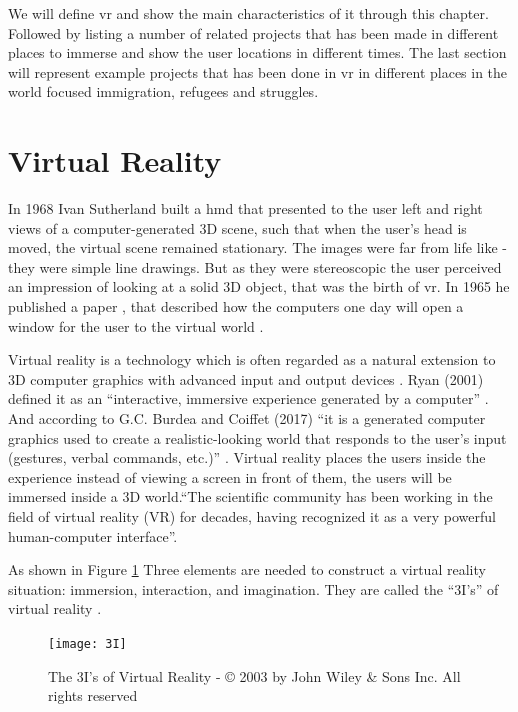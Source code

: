 We will define \acrfull{vr} and show the main characteristics of it through this chapter. Followed by listing a number of related projects that has been made in different places to immerse and show the user locations in different times. The last section will represent example projects that has been done in \acrshort{vr} in different places in the world focused immigration, refugees and struggles.   

\section{Virtual Reality}
In 1968 Ivan Sutherland built a \acrlong{hmd} that presented to the user left and right views of a
computer-generated 3D scene, such that when the user's head is moved, the virtual
scene remained stationary. The images were far from life like - they were simple line
drawings. But as they were stereoscopic the user perceived an impression of looking
at a solid 3D object, that was the birth of \acrlong{vr}. In 1965 he published a paper , that described how the computers one day will open a window for the user to the virtual world \citep{Vince2011}.  

Virtual reality is a technology which is often regarded as a natural extension to 3D computer graphics with advanced input and output devices \citep{Jayaram1997}. Ryan (2001) defined it as an “interactive, immersive experience generated by a computer” \citep{Ryan2001}. And according to G.C. Burdea and Coiffet (2017) “it is a generated computer graphics used to create a realistic-looking world that responds to the user’s input (gestures, verbal commands, etc.)” \cite[p.20]{burdea2017virtual}. Virtual reality places the users inside the experience instead of viewing a screen in front of them, the users will be immersed inside a 3D world.“The scientific community has been working in the field of virtual reality (VR) for decades, having recognized it as a very powerful human-computer interface”\cite[p.19]{burdea2017virtual}. 

As shown in Figure \ref{fig:3I} Three elements are needed to construct a virtual reality situation: immersion, interaction, and imagination. They are called the “3I’s” of virtual reality \citep{Hu2016,burdea2017virtual}.

\begin{figure} %
    \centering
    \texttt{[image: 3I]}
    \caption{The 3I's of Virtual Reality - © 2003 by John Wiley \& Sons Inc. All rights
reserved}
    \label{fig:3I}
\end{figure}



